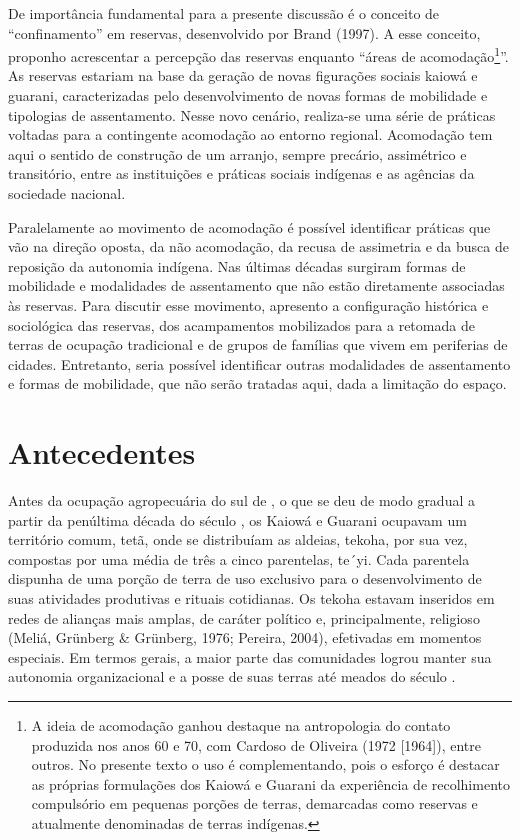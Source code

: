 {{De importância fundamental para a presente discussão é o conceito de
``confinamento'' em reservas, desenvolvido por Brand (1997). A esse
conceito, proponho acrescentar a percepção das reservas enquanto ``áreas
de acomodação\footnote{A ideia de acomodação ganhou destaque na
antropologia do contato produzida nos anos 60 e 70, com Cardoso de
Oliveira (1972 [1964]), entre outros. No presente texto o uso é
complementando, pois o esforço é destacar as próprias formulações dos
Kaiowá e Guarani da experiência de recolhimento compulsório em pequenas
porções de terras, demarcadas como reservas e atualmente denominadas de
terras indígenas. }''. As reservas estariam na base da geração de novas
figurações sociais kaiowá e guarani, caracterizadas pelo
desenvolvimento de novas formas de mobilidade e tipologias de
assentamento. Nesse novo cenário, realiza-se uma série de práticas
voltadas para a contingente acomodação ao entorno regional. Acomodação
tem aqui o sentido de construção de um arranjo, sempre precário,
assimétrico e transitório, entre as instituições e práticas sociais
indígenas e as agências da sociedade nacional.

Paralelamente ao movimento de acomodação é possível identificar práticas
que vão na direção oposta, da não acomodação, da recusa de assimetria e
da busca de reposição da autonomia indígena. Nas últimas décadas
surgiram formas de mobilidade e modalidades de assentamento que não
estão diretamente associadas às reservas. Para discutir esse movimento,
apresento a configuração histórica e sociológica das reservas, dos
acampamentos mobilizados para a retomada de terras de ocupação
tradicional e de grupos de famílias que vivem em periferias de cidades.
Entretanto, seria possível identificar outras modalidades de
assentamento e formas de mobilidade, que não serão tratadas aqui, dada
a limitação do espaço. 

\section{Antecedentes}

Antes da ocupação agropecuária do sul de , o que se deu de modo
gradual a partir da penúltima década do século , os Kaiowá e Guarani
ocupavam um território comum, tetã, onde se distribuíam as aldeias,
tekoha, por sua vez, compostas por uma média de três a cinco
parentelas, te´yi. Cada parentela dispunha de uma porção de terra de
uso exclusivo para o desenvolvimento de suas atividades produtivas e
rituais cotidianas. Os tekoha estavam inseridos em redes de alianças
mais amplas, de caráter político e, principalmente, religioso (Meliá,
Grünberg \& Grünberg, 1976; Pereira, 2004), efetivadas em momentos
especiais. Em termos gerais, a maior parte das comunidades logrou
manter sua autonomia organizacional e a posse de suas terras até meados
do século .

}}
